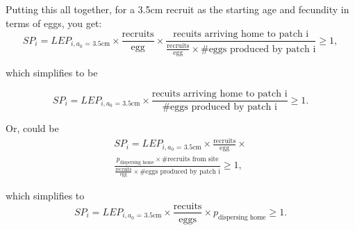 \documentclass[12pt, oneside]{article}   	%
\begin{document}
Putting this all together, for a 3.5cm recruit as the starting age and fecundity in terms of eggs, you get:
\begin{equation}
SP_i = LEP_{i, \text{$a_0$ = 3.5cm}} \times \frac{\text{recruits}}{\text{egg}} \times \frac{\text{recuits arriving home to patch i}}{\frac{\text{recruits}}{\text{egg}} \times \# \text{eggs produced by patch i}} \geq 1, 
\end{equation}

which simplifies to be

\begin{equation}
SP_i = LEP_{i, \text{$a_0$ = 3.5cm}} \times \frac{\text{recuits arriving home to patch i}}{\# \text{eggs produced by patch i}} \geq 1. %
\end{equation}

Or, could be
\begin{multline}
SP_i = LEP_{i, \text{$a_0$ = 3.5cm}} \times \frac{\text{recruits}}{\text{egg}} \times \\ \frac{p_{\text{dispersing home}} \times \text{\# recruits from site}}{\frac{\text{recruits}}{\text{egg}} \times \# \text{eggs produced by patch i}} \geq 1, 
\end{multline}

which simplifies to
\begin{equation}
SP_i = LEP_{i, \text{$a_0$ = 3.5cm}} \times \frac{\text{recuits}}{\text{eggs}} \times p_{\text{dispersing home}} \geq 1. %
\end{equation}
\end{document}
